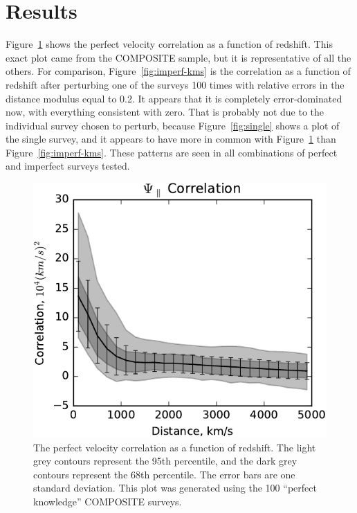 \documentclass[usenatbib]{mn2e}
\begin{document}
\section{Results}
Figure~\ref{fig:perf-kms} shows the perfect velocity correlation as a function of redshift. This exact plot came from the COMPOSITE sample, but it is representative of all the others. For comparison, Figure~\ref{fig:imperf-kms} is the correlation as a function of redshift after perturbing one of the surveys 100 times with relative errors in the distance modulus equal to 0.2. It appears that it is completely error-dominated now, with everything consistent with zero. That is probably not due to the individual survey chosen to perturb, because Figure~\ref{fig:single} shows a plot of the single survey, and it appears to have more in common with Figure~\ref{fig:perf-kms} than Figure~\ref{fig:imperf-kms}. These patterns are seen in all combinations of perfect and imperfect surveys tested.
\begin{figure}
  \begin{center}
  \includegraphics[scale=0.75]{psipar-perf-kms.pdf}
  \end{center}
\caption{\small
The perfect velocity correlation as a function of redshift. The light grey contours represent the 95th percentile, and the dark grey contours represent the 68th percentile. The error bars are one standard deviation. This plot was generated using the 100 ``perfect knowledge'' COMPOSITE surveys.
}
\label{fig:perf-kms}
\end{figure}
\end{document}
